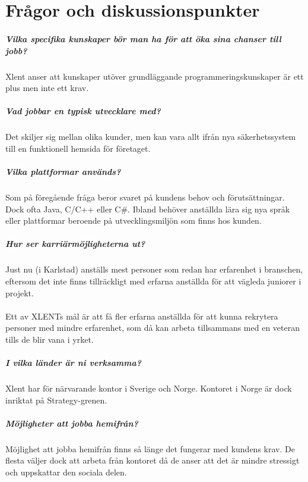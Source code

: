 \documentclass[../report.tex]{subfiles}
\begin{document}
    \chapter{Frågor och diskussionspunkter}
    
    \paragraph{Vilka specifika kunskaper bör man ha för att öka sina chanser till jobb?}
    Xlent anser att kunskaper utöver grundläggande programmeringskunskaper är ett plus men inte ett krav.
    
    \paragraph{Vad jobbar en typisk utvecklare med?}
    Det skiljer sig mellan olika kunder, men kan vara allt ifrån nya säkerhetssystem till en funktionell hemsida för företaget.
    
    \paragraph{Vilka plattformar används?}
    Som på föregående fråga beror svaret på kundens behov och förutsättningar. Dock ofta Java, C/C++ eller C\#. Ibland behöver anställda lära sig nya språk eller plattformar beroende på utvecklingsmiljön som finns hos kunden.
    
    \paragraph{Hur ser karriärmöjligheterna ut?}
    Just nu (i Karlstad) anställs mest personer som redan har erfarenhet i branschen, eftersom det inte finns tillräckligt med erfarna anställda för att vägleda juniorer i projekt.\\
\\
    Ett av XLENTs mål är att få fler erfarna anställda för att kunna rekrytera personer med mindre erfarenhet, som då kan arbeta tillsammans med en veteran tills de blir vana i yrket.
    
    \paragraph{I vilka länder är ni verksamma?}
    Xlent har för närvarande kontor i Sverige och Norge. Kontoret i Norge är dock inriktat på Strategy-grenen.
    
    \paragraph{Möjligheter att jobba hemifrån?}
    Möjlighet att jobba hemifrån finns så länge det fungerar med kundens krav. De flesta väljer dock att arbeta från kontoret då de anser att det är mindre stressigt och uppskattar den sociala delen.
    
\end{document}
